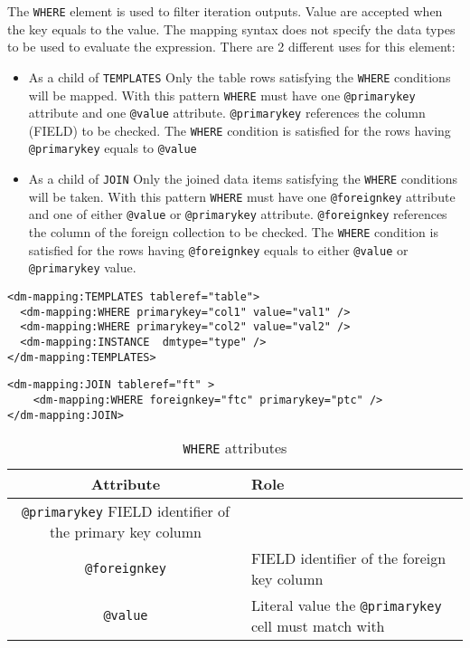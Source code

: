 The \texttt{WHERE} element is used to filter iteration outputs. Value are accepted when the key equals to the value. The mapping syntax does not specify the data types to be used to evaluate the expression. 
There  are 2 different uses for this element:
\begin{itemize}
    \item As a child of \texttt{TEMPLATES}  Only the table rows satisfying the \texttt{WHERE} conditions will be mapped. 
             With this pattern \texttt{WHERE} must have one \texttt{@primarykey} attribute and one \texttt{@value} attribute. 
              \texttt{@primarykey} references the column (FIELD) to be checked. 
             The \texttt{WHERE} condition is satisfied for the rows having \texttt{@primarykey} equals to \texttt{@value}     \item As a child of \texttt{JOIN}  Only the joined data items satisfying the \texttt{WHERE} conditions will be taken. 
             With this pattern \texttt{WHERE} must have one \texttt{@foreignkey} attribute and one of either \texttt{@value} or \texttt{@primarykey} attribute. 
              \texttt{@foreignkey} references the column of the foreign collection to be checked. 
             The \texttt{WHERE} condition is satisfied for the rows having \texttt{@foreignkey} equals to either \texttt{@value} or \texttt{@primarykey} value.
\end{itemize}
\begin{lstlisting}[frame=single,caption={\texttt{WHERE} Example: only rows having val1 as col1 value and  val2 as col2 value are mapped},style=XML,basicstyle=\tiny]
<dm-mapping:TEMPLATES tableref="table">
  <dm-mapping:WHERE primarykey="col1" value="val1" />
  <dm-mapping:WHERE primarykey="col2" value="val2" />
  <dm-mapping:INSTANCE  dmtype="type" />
</dm-mapping:TEMPLATES>
\end{lstlisting}

\begin{lstlisting}[frame=single,caption={\texttt{WHERE} Example: the join is satisfied when the value of the ptc column  is equals to the ftc column of the foreign table },style=XML,basicstyle=\tiny]
<dm-mapping:JOIN tableref="ft" >
	<dm-mapping:WHERE foreignkey="ftc" primarykey="ptc" />
</dm-mapping:JOIN>
\end{lstlisting}

\begin{table}[!htbp]
\small
\centering
\begin{tabulary}{\linewidth}{|c|J|}       
       \hline 
            \textbf{Attribute} & 
            \textbf {Role}\\
       \hline         \hline  
            \texttt{@primarykey}  
            FIELD identifier of the primary key column \\
        \hline 
            \texttt{@foreignkey} & 
            FIELD identifier of the foreign key column \\
        \hline 
            \texttt{@value} & 
            Literal value the  \texttt{@primarykey} cell must match with\\
        \hline 
     \end{tabulary}
     \caption{\texttt{WHERE} attributes} 
     \label{tbl:where-att}
 \end{table}

